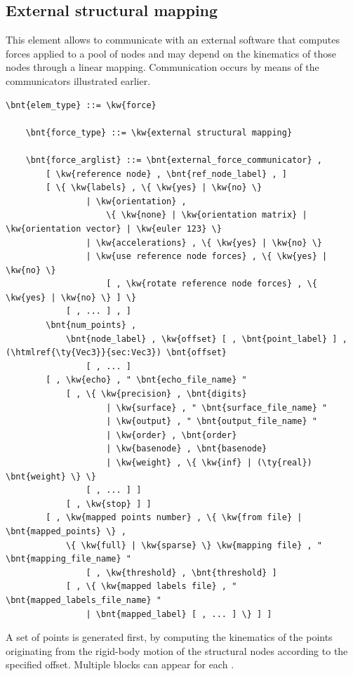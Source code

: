 \subsection{External structural mapping}
\label{sec:EL:FORCE:EXTERNAL:STRUCTURAL_MAPPING}
This element allows to communicate with an external software that computes
forces applied to a pool of nodes and may depend on the kinematics of those
nodes through a linear mapping.
Communication occurs by means of the communicators illustrated earlier.
\begin{Verbatim}[commandchars=\\\{\}]
    \bnt{elem_type} ::= \kw{force}

    \bnt{force_type} ::= \kw{external structural mapping}

    \bnt{force_arglist} ::= \bnt{external_force_communicator} ,
        [ \kw{reference node} , \bnt{ref_node_label} , ]
        [ \{ \kw{labels} , \{ \kw{yes} | \kw{no} \}
                | \kw{orientation} ,
                    \{ \kw{none} | \kw{orientation matrix} | \kw{orientation vector} | \kw{euler 123} \}
                | \kw{accelerations} , \{ \kw{yes} | \kw{no} \}
                | \kw{use reference node forces} , \{ \kw{yes} | \kw{no} \}
                    [ , \kw{rotate reference node forces} , \{ \kw{yes} | \kw{no} \} ] \}
            [ , ... ] , ]
        \bnt{num_points} ,
            \bnt{node_label} , \kw{offset} [ , \bnt{point_label} ] , (\htmlref{\ty{Vec3}}{sec:Vec3}) \bnt{offset}
                [ , ... ]
        [ , \kw{echo} , " \bnt{echo_file_name} "
            [ , \{ \kw{precision} , \bnt{digits}
                    | \kw{surface} , " \bnt{surface_file_name} "
                    | \kw{output} , " \bnt{output_file_name} "
                    | \kw{order} , \bnt{order}
                    | \kw{basenode} , \bnt{basenode}
                    | \kw{weight} , \{ \kw{inf} | (\ty{real}) \bnt{weight} \} \}
                [ , ... ] ]
            [ , \kw{stop} ] ]
        [ , \kw{mapped points number} , \{ \kw{from file} | \bnt{mapped_points} \} ,
            \{ \kw{full} | \kw{sparse} \} \kw{mapping file} , " \bnt{mapping_file_name} "
                [ , \kw{threshold} , \bnt{threshold} ]
            [ , \{ \kw{mapped labels file} , " \bnt{mapped_labels_file_name} "
                | \bnt{mapped_label} [ , ... ] \} ] ]
\end{Verbatim}
A set of  points is generated first,
by computing the kinematics of the points originating
from the rigid-body motion of the structural nodes 
according to the specified offset.
Multiple  blocks can appear for each .

